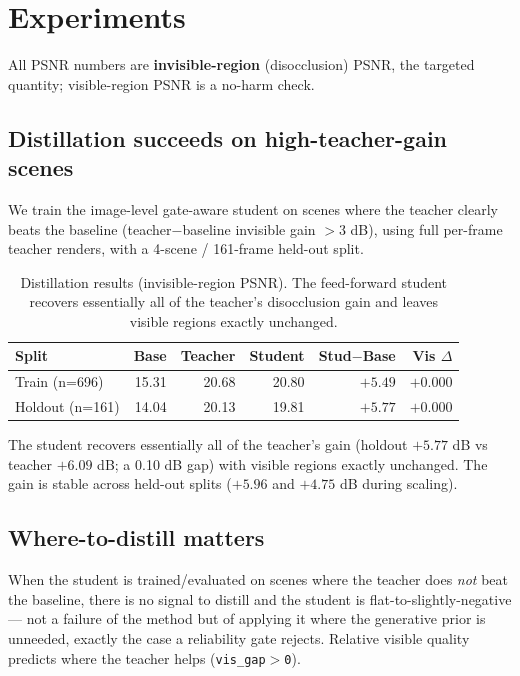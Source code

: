\documentclass[10pt,twocolumn,letterpaper]{article}
\begin{document}
\section{Experiments}
\label{sec:exp}
All PSNR numbers are \textbf{invisible-region} (disocclusion) PSNR, the targeted
quantity; visible-region PSNR is a no-harm check.

\subsection{Distillation succeeds on high-teacher-gain scenes}
We train the image-level gate-aware student on scenes where the teacher clearly
beats the baseline (teacher$-$baseline invisible gain $>3$ dB), using full
per-frame teacher renders, with a 4-scene / 161-frame held-out split.

\begin{table}[t]
\centering\small
\caption{Distillation results (invisible-region PSNR). The feed-forward student
recovers essentially all of the teacher's disocclusion gain and leaves visible
regions exactly unchanged.}
\begin{tabular}{lrrrrr}
\toprule
Split & Base & Teacher & Student & Stud$-$Base & Vis $\Delta$ \\
\midrule
Train (n=696) & 15.31 & 20.68 & 20.80 & $\mathbf{+5.49}$ & $+0.000$ \\
Holdout (n=161) & 14.04 & 20.13 & 19.81 & $\mathbf{+5.77}$ & $+0.000$ \\
\bottomrule
\end{tabular}
\end{table}
The student recovers essentially all of the teacher's gain (holdout $+5.77$ dB
vs teacher $+6.09$ dB; a 0.10 dB gap) with visible regions exactly unchanged.
The gain is stable across held-out splits ($+5.96$ and $+4.75$ dB during
scaling).

\subsection{Where-to-distill matters}
When the student is trained/evaluated on scenes where the teacher does \emph{not}
beat the baseline, there is no signal to distill and the student is
flat-to-slightly-negative --- not a failure of the method but of applying it
where the generative prior is unneeded, exactly the case a reliability gate
rejects. Relative visible quality predicts where the teacher helps
(\texttt{vis\_gap$>$0}).
\end{document}
